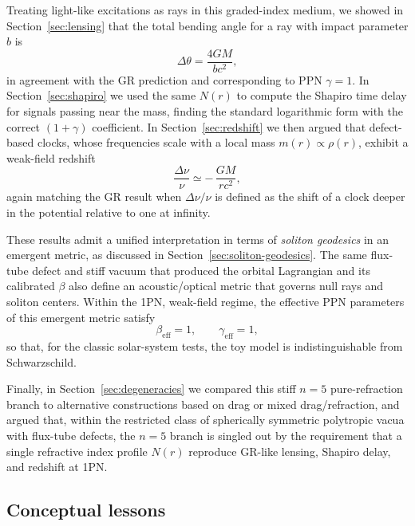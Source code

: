 \documentclass[11pt]{article}
\begin{document}
Treating light-like excitations as rays in this graded-index medium, we
showed in Section~\ref{sec:lensing} that the total bending angle for a ray
with impact parameter $b$ is
\begin{equation}
  \Delta\theta = \frac{4GM}{b c^2},
\end{equation}
in agreement with the GR prediction and corresponding to PPN
$\gamma = 1$.
In Section~\ref{sec:shapiro} we used the same $N(r)$ to compute the
Shapiro time delay for signals passing near the mass, finding the standard
logarithmic form with the correct $(1+\gamma)$ coefficient.
In Section~\ref{sec:redshift} we then argued that defect-based clocks,
whose frequencies scale with a local mass $m(r)\propto\rho(r)$, exhibit a
weak-field redshift
\begin{equation}
  \frac{\Delta\nu}{\nu}
  \simeq -\,\frac{GM}{r c^2},
\end{equation}
again matching the GR result when $\Delta\nu/\nu$ is defined as the shift of
a clock deeper in the potential relative to one at infinity.

These results admit a unified interpretation in terms of \emph{soliton
geodesics} in an emergent metric, as discussed in
Section~\ref{sec:soliton-geodesics}.
The same flux-tube defect and stiff vacuum that produced the orbital
Lagrangian and its calibrated $\beta$ also define an acoustic/optical
metric that governs null rays and soliton centers.
Within the 1PN, weak-field regime, the effective PPN parameters of this
emergent metric satisfy
\begin{equation}
  \beta_{\mathrm{eff}} = 1,
  \qquad
  \gamma_{\mathrm{eff}} = 1,
\end{equation}
so that, for the classic solar-system tests, the toy model is
indistinguishable from Schwarzschild.

Finally, in Section~\ref{sec:degeneracies} we compared this stiff
$n=5$ pure-refraction branch to alternative constructions based on drag or
mixed drag/refraction, and argued that, within the restricted class of
spherically symmetric polytropic vacua with flux-tube defects, the
$n=5$ branch is singled out by the requirement that a single refractive
index profile $N(r)$ reproduce GR-like lensing, Shapiro delay, and
redshift at 1PN.


\subsection{Conceptual lessons}
\label{subsec:discussion-conceptual}
\end{document}
